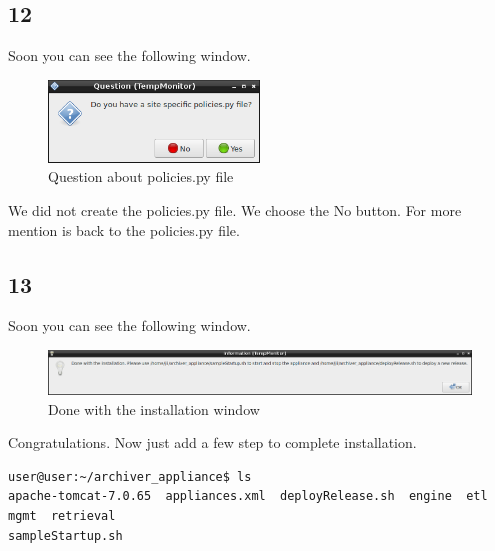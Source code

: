 \documentclass[11pt
  , a4paper
  , article
  , oneside
]{memoir}
\begin{document}
\subsection{12}
Soon you can see the following window.

\begin{figure}[h!]
	\centering
	\includegraphics[width=0.5\textwidth, height=0.2\textwidth]{./images/7.png}
	\caption{Question about policies.py file}
\end{figure}

We did not create the policies.py file. We choose the No button. For more mention is back to the policies.py file.
\clearpage
\subsection{13}
Soon you can see the following window.

\begin{figure}[h!]
	\centering
	\includegraphics[width=1\textwidth, height=0.2\textwidth]{./images/8.png}
	\caption{Done with the installation window}
\end{figure}

Congratulations. Now just add a few step to complete installation.
\begin{lstlisting}[style=termstyle]
user@user:~/archiver_appliance$ ls
apache-tomcat-7.0.65  appliances.xml  deployRelease.sh  engine  etl  mgmt  retrieval
sampleStartup.sh
\end{lstlisting}
\end{document}
